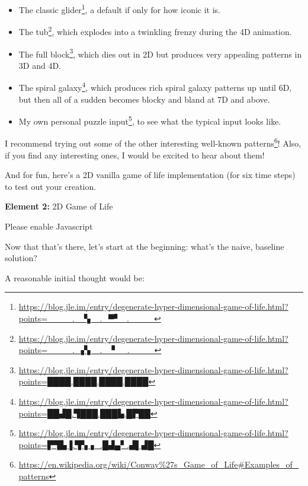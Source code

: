 \documentclass[]{article}
\renewcommand{\href}[2]{#2\footnote{\url{#1}}}
\begin{document}
\begin{itemize}
\tightlist
\item
  The
  \href{https://blog.jle.im/entry/degenerate-hyper-dimensional-game-of-life.html?points=____._▝▖_._▀▘_.____}{classic
  glider}, a default if only for how iconic it is.
\item
  The
  \href{https://blog.jle.im/entry/degenerate-hyper-dimensional-game-of-life.html?points=____._▞▖_._▝__.____}{tub},
  which explodes into a twinkling frenzy during the 4D animation.
\item
  The
  \href{https://blog.jle.im/entry/degenerate-hyper-dimensional-game-of-life.html?points=████.████.████.████}{full
  block}, which dies out in 2D but produces very appealing patterns in 3D and
  4D.
\item
  The
  \href{https://blog.jle.im/entry/degenerate-hyper-dimensional-game-of-life.html?points=██▟█.▜███.███▙.█▛██}{spiral
  galaxy}, which produces rich spiral galaxy patterns up until 6D, but then all
  of a sudden becomes blocky and bland at 7D and above.
\item
  My
  \href{https://blog.jle.im/entry/degenerate-hyper-dimensional-game-of-life.html?points=▛▜▙▐.▜▚▗_.█▟▄▘.▟▌▟█}{own
  personal puzzle input}, to see what the typical input looks like.
\end{itemize}

I recommend trying out some of the
\href{https://en.wikipedia.org/wiki/Conway\%27s_Game_of_Life\#Examples_of_patterns}{other
interesting well-known patterns}! Also, if you find any interesting ones, I
would be excited to hear about them!

And for fun, here's a 2D vanilla game of life implementation (for six time
steps) to test out your creation.

\leavevmode\hypertarget{gol2D}{}%
\textbf{Element 2:} 2D Game of Life

\leavevmode\hypertarget{gol2DCont}{}%
Please enable Javascript

Now that that's there, let's start at the beginning: what's the naive, baseline
solution?

A reasonable initial thought would be:
\end{document}
